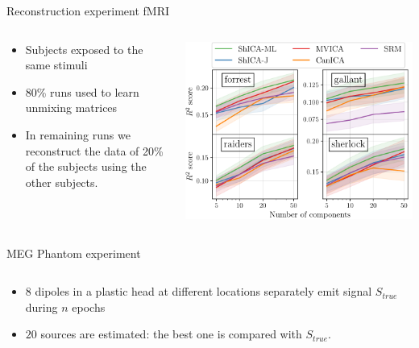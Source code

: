 \documentclass[final]{beamer}
\newlength{\onecolwid}
\newlength{\onecolwidthree}
\begin{document}
\begin{frame}[t]
\begin{columns}[t]
\begin{column}{\onecolwidthree}
    \begin{block}{Reconstruction experiment fMRI}
      \begin{columns}
        \begin{column}{0.4 \textwidth}
          \begin{itemize}
          \item Subjects exposed to the same stimuli
          \item 80\% runs used to learn unmixing matrices
          \item In remaining runs we reconstruct the data of 20\% of the
            subjects using the other subjects.
          \end{itemize}
      \end{column}
      \begin{column}{0.6 \textwidth}
          \begin{center}
            \includegraphics[width=\textwidth]{./figures/reconstruction.pdf}
          \end{center}
      \end{column}
      \end{columns}
    \end{block}

    \vspace{-3em}
    \begin{block}{MEG Phantom experiment}
      \begin{columns}

        \begin{column}{0.4 \textwidth}
          \begin{itemize}
            \item 8 dipoles in a plastic head at different locations separately
              emit signal $S_{true}$ during $n$ epochs
            \item $20$ sources are estimated: the best one is compared with $S_{true}$.
          \end{itemize}
    \end{column}


\end{columns}
\end{block}
\end{column}
\end{columns}
\end{frame}
\end{document}
